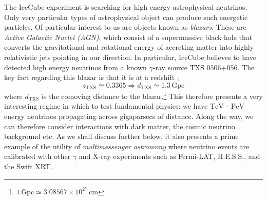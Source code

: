 \documentclass[11pt]{article}
\numberwithin{equation}{section}
\numberwithin{figure}{section}
\numberwithin{table}{section}
\begin{document}
\noindent The IceCube experiment is searching for high energy astrophysical neutrinos. Only very particular types of astrophysical object can produce such energetic particles. Of particular interest to us are objects known as \textit{blazars}. These are \textit{Active Galactic Nuclei (AGN)}, which consist of a supermassive black hole that converts the gravitational and rotational energy of accreting matter into highly relativistic jets \cite{Ackermann2018} pointing in our direction. In particular, IceCube believes to have detected high energy neutrinos from a known $\gamma$-ray source TXS $0506$+$056$. The key fact regarding this blazar is that it is at a redshift \cite{Kelly};
\begin{equation}
  z_{\mathrm{TXS}} \simeq 0.3365 \Rightarrow d_{\mathrm{TXS}} \simeq 1.3 \, \textrm{Gpc}
\end{equation}
\noindent where $d_{\mathrm{TXS}}$ is the comoving distance to the blazar.\footnote{$1\,\textrm{Gpc} \simeq 3.08567 \times 10^{27} \, \textrm{cm}$} This therefore presents a very interesting regime in which to test fundamental physics: we have $\textrm{TeV}$ - $\textrm{PeV}$ energy neutrinos propagating across gigaparsecs of distance. Along the way, we can therefore consider interactions with dark matter, the cosmic neutrino background etc. As we shall discuss further below, it also presents a prime example of the utility of \textit{multimessenger astronomy} \cite{Kelly, Ackermann2018} where neutrino events are calibrated with other $\gamma$ and X-ray experiments such as Fermi-LAT, H.E.S.S., and the Swift XRT.
\end{document}
